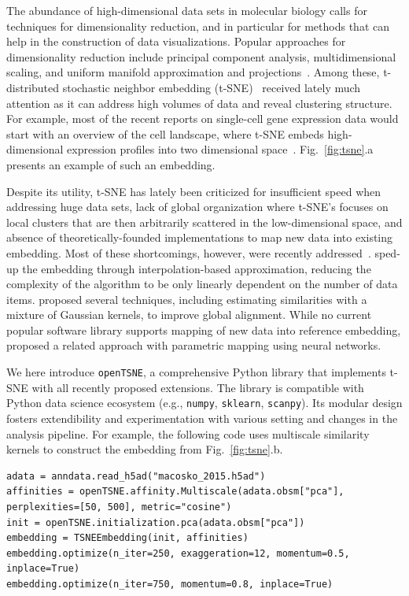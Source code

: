 \documentclass{bioinfo}
\begin{document}
The abundance of high-dimensional data sets in molecular biology calls for techniques for dimensionality reduction, and in particular for methods that can help in the construction of data visualizations. Popular approaches for dimensionality reduction include principal component analysis, multidimensional scaling, and uniform manifold approximation and projections~\citep{}. Among these, t-distributed stochastic neighbor embedding (t-SNE)~\citep{tsne,review-tsne} received lately much attention as it can address high volumes of data and reveal clustering structure. For example, most of the recent reports on single-cell gene expression data would start with an overview of the cell landscape, where t-SNE embeds high-dimensional expression profiles into two dimensional space~\citep{Macosko2015, Shekhar2016,three}. Fig.~\ref{fig:tsne}.a presents an example of such an embedding.

Despite its utility, t-SNE has lately been criticized for insufficient speed when addressing huge data sets, lack of global organization where t-SNE's focuses on local clusters that are then arbitrarily scattered in the low-dimensional space, and absence of theoretically-founded implementations to map new data into existing embedding. Most of these shortcomings, however, were recently addressed~\citep{ding2018interpretable,becht2019dimensionality}. \citet{fi_tsne} sped-up the embedding through interpolation-based approximation, reducing the complexity of the algorithm to be only linearly dependent on the number of data items. \citet{art_of_using_tsne} proposed several techniques, including estimating similarities with a mixture of Gaussian kernels, to improve global alignment. While no current popular software library supports mapping of new data into reference embedding, \citet{parametric_tsne} proposed a related approach with parametric mapping using neural networks.

We here introduce {\tt openTSNE}, a comprehensive Python library that implements t-SNE with all recently proposed extensions. The library is compatible with Python data science ecosystem (e.g., {\tt numpy}, {\tt sklearn}, {\tt scanpy}). Its modular design fosters extendibility and experimentation with various setting and changes in the analysis pipeline. For example, the following code uses multiscale similarity kernels to construct the embedding from Fig.~\ref{fig:tsne}.b.

\begin{lstlisting}
adata = anndata.read_h5ad("macosko_2015.h5ad")
affinities = openTSNE.affinity.Multiscale(adata.obsm["pca"], perplexities=[50, 500], metric="cosine")
init = openTSNE.initialization.pca(adata.obsm["pca"])
embedding = TSNEEmbedding(init, affinities)
embedding.optimize(n_iter=250, exaggeration=12, momentum=0.5, inplace=True)
embedding.optimize(n_iter=750, momentum=0.8, inplace=True)
\end{lstlisting}
\end{document}
